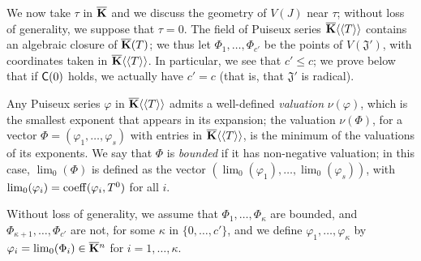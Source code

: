 \documentclass[12pt]{article}
\begin{document}
We now take $\tau$ in $\overline{\mathbf{K}}$ and we discuss the geometry of $V(J)$
near $\tau$; without loss of generality, we suppose that $\tau=0$.
The field of Puiseux series $\overline{\mathbf{K}}\langle\langle T \rangle\rangle$
contains an algebraic closure of $\overline{\mathbf{K}}(T)$; we thus let
$\Phi_1,\dots,\Phi_{c'}$ be the points of $V(\mathfrak{J}')$, with
coordinates taken in $\overline{\mathbf{K}}\langle\langle T \rangle\rangle$. In
particular, we see that $c' \le c$; we prove below that if $\mathsf{C}(0)$
holds, we actually have $c'=c$ (that is, that $\mathfrak{J}'$ is radical).

Any Puiseux series $\varphi$ in $\overline{\mathbf{K}}\langle\langle T
\rangle\rangle$ admits a well-defined {\em valuation} $\nu(\varphi)$,
which is the smallest exponent that appears in its expansion; the
valuation $\nu(\Phi)$, for a vector $\Phi=(\varphi_1,\dots,\varphi_s)$
with entries in $\overline{\mathbf{K}}\langle\langle T \rangle\rangle$, is the
minimum of the valuations of its exponents. We say that $\Phi$ is {\em
  bounded} if it has non-negative valuation; in this case,
$\lim_0(\Phi)$ is defined as the vector
$(\lim_0(\varphi_1),\dots,\lim_0(\varphi_s))$, with
$\lim_0(\varphi_i)={\rm coeff}(\varphi_i,T^0)$ for all $i$.

Without loss of generality, we assume that
$\Phi_1,\dots,\Phi_\kappa$ are bounded, and
$\Phi_{\kappa+1},\dots,\Phi_{c'}$ are not, for some $\kappa$ in
$\{0,\dots,c'\}$, and we define $\varphi_1,\dots,\varphi_\kappa$ by
$\varphi_i=\lim_0(\Phi_i)\in\overline{\mathbf{K}}{}^n$ for
$i=1,\dots,\kappa$.
\end{document}
